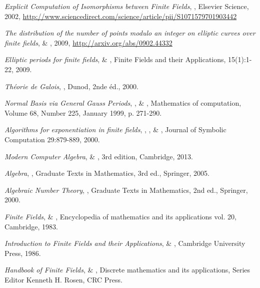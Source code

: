 \documentclass[a4paper]{article} %
\numberwithin{section}{part}
\numberwithin{equation}{section}
\begin{document}
\begin{thebibliography}{LC}

 \emph{Explicit Computation of Isomorphisms between Finite
Fields}, , Elsevier Science, 2002, 
\url{http://www.sciencedirect.com/science/article/pii/S1071579701903442}

 \emph{The distribution of the number of points modulo an
integer on elliptic curves over finite fields},  \&
, 2009, \url{http://arxiv.org/abs/0902.44332} 

 \emph{Elliptic periods for finite fields},  \& , Finite Fields and their Applications,
15(1):1-22, 2009.

 \emph{Théorie de Galois}, , Dunod, 2nde
éd., 2000.

 \emph{Normal Basis \textup{via} General Gauss Periods},
,  \& , 
Mathematics of computation, Volume 68, Number 225, January 1999, p. 271-290.

 \emph{Algorithms for exponentiation in finite fields},
, ,  \& 
, Journal of Symbolic Computation 29:879-889, 2000.

 \emph{Modern Computer Algebra},  \&
, 3rd edition, Cambridge, 2013.

 \emph{Algebra}, , Graduate Texts in Mathematics,
3rd ed., Springer, 2005.

 \emph{Algebraic Number Theory}, , Graduate Texts
in Mathematics, 2nd ed., Springer, 2000.

 \emph{Finite Fields},  \& 
, Encyclopedia of mathematics and its applications vol.
20, Cambridge, 1983.

 \emph{Introduction to Finite Fields and their Applications},
 \& , Cambridge University Press,
1986.

 \emph{Handbook of Finite Fields},  \& 
, Discrete mathematics and its applications, Series Editor 
Kenneth H. Rosen, CRC Press.


\end{thebibliography}
\end{document}
